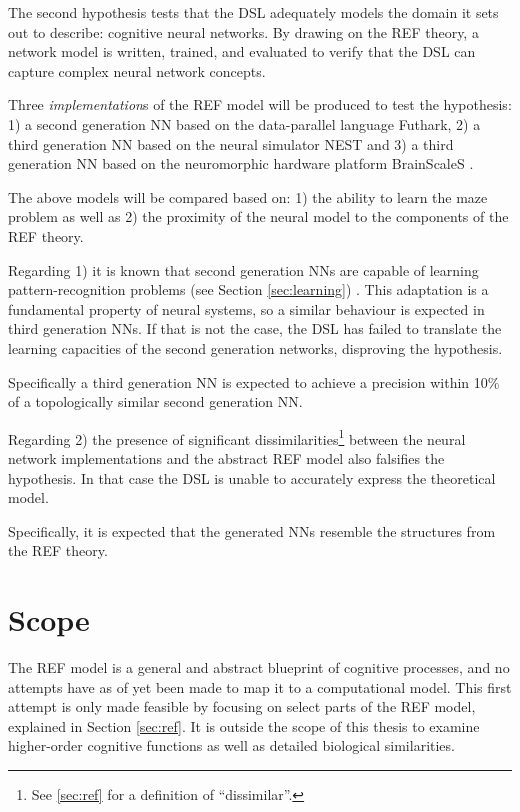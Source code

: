 \documentclass[report.tex]{subfiles}
\begin{document}
The second hypothesis tests that the DSL adequately models the domain it sets
out to describe: cognitive neural networks.
By drawing on the REF theory, a network model is written, trained, and evaluated to verify
that the DSL can capture complex neural network concepts.

Three \textit{implementation}s of the \gls{REF} model will be
produced to test the hypothesis: 
  1) a second generation \gls{NN} based on the data-parallel language Futhark, 
  2) a third generation \gls{NN} based on the neural simulator \gls{NEST} and
  3) a third generation \gls{NN} based on the neuromorphic 
     hardware platform BrainScaleS .

The above models will be compared based on:
1) the ability to learn the maze problem as well as 
2) the proximity of the neural model to the components of the
   \gls{REF} theory.

Regarding 1) it is known that second generation \gls{NN}s are
capable of learning pattern-recognition problems (see Section \ref{sec:learning})
\cite{Russel2007}.
This adaptation is a fundamental property of neural systems, so a
similar behaviour is expected in third generation \gls{NN}s.
If that is not the case, the \gls{DSL} has failed to translate
the learning capacities of the second generation networks,
disproving the hypothesis.

Specifically a third generation \gls{NN} is expected to
achieve a precision within 10\% of a topologically similar
second generation \gls{NN}.

Regarding 2) the presence of significant
dissimilarities\footnote{See \ref{sec:ref} for a definition of
\enquote{dissimilar}.} between the neural network implementations 
and the abstract \gls{REF} model also falsifies the hypothesis. 
In that case the \gls{DSL} is unable to accurately express the
theoretical model.

Specifically, it is expected that the generated \gls{NN}s resemble
the structures from the \gls{REF} theory.

\section{Scope} \label{sec:scope}
The \gls{REF} model is a general and abstract blueprint of cognitive
processes, and no attempts have as of yet been made to map it to
a computational model.
This first attempt is only made feasible by focusing on select parts
of the \gls{REF} model, explained in Section \ref{sec:ref}.
It is outside the scope of this thesis to examine
higher-order cognitive functions as well as detailed biological
similarities.
\end{document}
